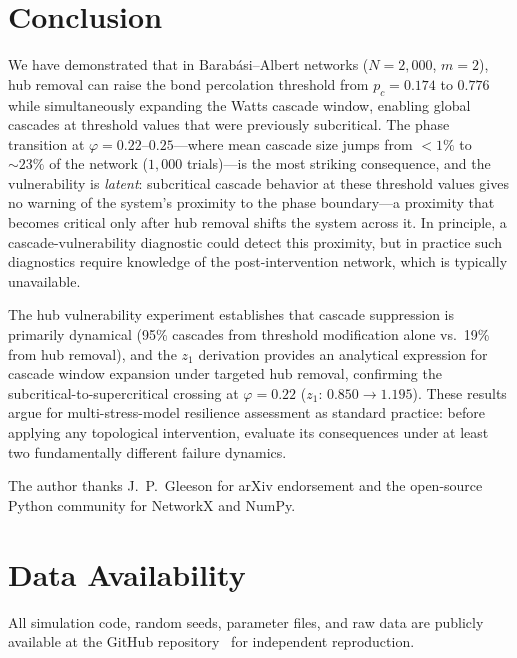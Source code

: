 \documentclass[aps,pre,twocolumn,superscriptaddress,showpacs]{revtex4-2}
\newcommand{\pc}{p_c}
\begin{document}
\section{Conclusion}
\label{sec:conclusion}

We have demonstrated that in Barab\'asi--Albert networks ($N=2{,}000$, $m=2$), hub removal can raise the bond percolation threshold from $\pc=0.174$ to $0.776$ while simultaneously expanding the Watts cascade window, enabling global cascades at threshold values that were previously subcritical. The phase transition at $\varphi=0.22$--$0.25$---where mean cascade size jumps from $<1\%$ to ${\sim}23\%$ of the network ($1{,}000$ trials)---is the most striking consequence, and the vulnerability is \emph{latent}: subcritical cascade behavior at these threshold values gives no warning of the system's proximity to the phase boundary---a proximity that becomes critical only after hub removal shifts the system across it. In principle, a cascade-vulnerability diagnostic could detect this proximity, but in practice such diagnostics require knowledge of the post-intervention network, which is typically unavailable.

The hub vulnerability experiment establishes that cascade suppression is primarily dynamical (95\% cascades from threshold modification alone vs.\ 19\% from hub removal), and the $z_1$ derivation provides an analytical expression for cascade window expansion under targeted hub removal, confirming the subcritical-to-supercritical crossing at $\varphi=0.22$ ($z_1$: $0.850 \to 1.195$). These results argue for multi-stress-model resilience assessment as standard practice: before applying any topological intervention, evaluate its consequences under at least two fundamentally different failure dynamics.

\begin{acknowledgments}
The author thanks J.~P.~Gleeson for arXiv endorsement and the open-source Python community for NetworkX and NumPy.
\end{acknowledgments}

\section*{Data Availability}
All simulation code, random seeds, parameter files, and raw data are publicly available at the GitHub repository~\cite{CacheroGitHub2026} for independent reproduction.
\end{document}
